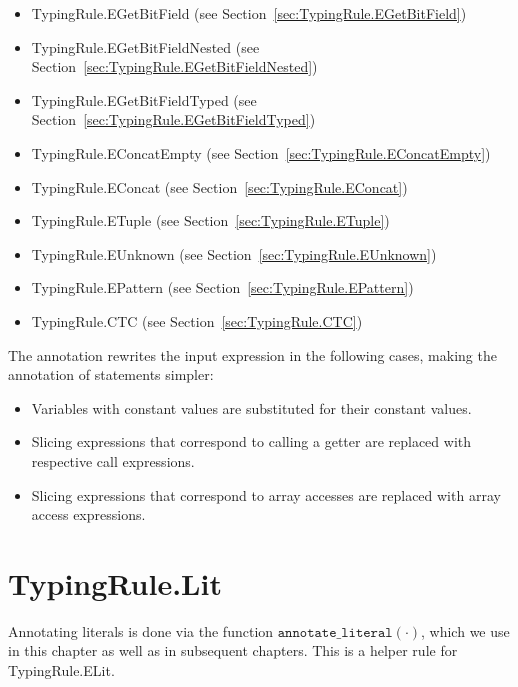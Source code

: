 \documentclass{book}
\newcommand\annotateliteral[1]{\texttt{annotate\_literal}(#1)}
\begin{document}
\begin{itemize}
\begin{itemize}
\item TypingRule.EGetBitField (see Section~\ref{sec:TypingRule.EGetBitField})
\item TypingRule.EGetBitFieldNested (see Section~\ref{sec:TypingRule.EGetBitFieldNested})
\item TypingRule.EGetBitFieldTyped (see Section~\ref{sec:TypingRule.EGetBitFieldTyped})
\item TypingRule.EConcatEmpty (see Section~\ref{sec:TypingRule.EConcatEmpty})
\item TypingRule.EConcat (see Section~\ref{sec:TypingRule.EConcat})
\item TypingRule.ETuple (see Section~\ref{sec:TypingRule.ETuple})
\item TypingRule.EUnknown (see Section~\ref{sec:TypingRule.EUnknown})
\item TypingRule.EPattern (see Section~\ref{sec:TypingRule.EPattern})
\item TypingRule.CTC (see Section~\ref{sec:TypingRule.CTC})
\end{itemize}

The annotation rewrites the input expression in the following cases, making the annotation of statements simpler:
\begin{itemize}
  \item Variables with constant values are substituted for their constant values.
  \item Slicing expressions that correspond to calling a getter are replaced with respective call expressions.
  \item Slicing expressions that correspond to array accesses are replaced with array access expressions.
\end{itemize}

\section{TypingRule.Lit \label{sec:TypingRule.Lit}}

Annotating literals is done via the function $\annotateliteral{\cdot}$,
which we use in this chapter as well as in subsequent chapters.
This is a helper rule for TypingRule.ELit.

\end{itemize}
\end{document}
